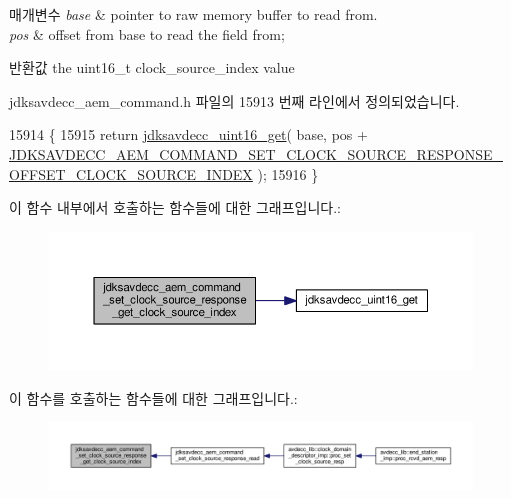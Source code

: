 \begin{DoxyParams}{매개변수}
{\em base} & pointer to raw memory buffer to read from. \\
\hline
{\em pos} & offset from base to read the field from; \\
\hline
\end{DoxyParams}
\begin{DoxyReturn}{반환값}
the uint16\+\_\+t clock\+\_\+source\+\_\+index value 
\end{DoxyReturn}


jdksavdecc\+\_\+aem\+\_\+command.\+h 파일의 15913 번째 라인에서 정의되었습니다.


\begin{DoxyCode}
15914 \{
15915     \textcolor{keywordflow}{return} \hyperlink{group__endian_ga3fbbbc20be954aa61e039872965b0dc9}{jdksavdecc\_uint16\_get}( base, pos + 
      \hyperlink{group__command__set__clock__source__response_ga253449bbd6222ad4b52fec3c7cf3aaa2}{JDKSAVDECC\_AEM\_COMMAND\_SET\_CLOCK\_SOURCE\_RESPONSE\_OFFSET\_CLOCK\_SOURCE\_INDEX}
       );
15916 \}
\end{DoxyCode}


이 함수 내부에서 호출하는 함수들에 대한 그래프입니다.\+:
\nopagebreak
\begin{figure}[H]
\begin{center}
\leavevmode
\includegraphics[width=350pt]{group__command__set__clock__source__response_gaff5350e050fff702114026f9230960ec_cgraph}
\end{center}
\end{figure}




이 함수를 호출하는 함수들에 대한 그래프입니다.\+:
\nopagebreak
\begin{figure}[H]
\begin{center}
\leavevmode
\includegraphics[width=350pt]{group__command__set__clock__source__response_gaff5350e050fff702114026f9230960ec_icgraph}
\end{center}
\end{figure}


